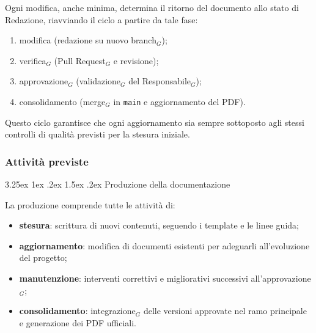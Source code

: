 \documentclass[a4paper, 10pt]{article}
\makeatletter
\renewcommand\paragraph{\@startsection{paragraph}{4}{\z@}%
  {3.25ex \@plus1ex \@minus .2ex}%
  {1.5ex \@plus .2ex}%
  {\normalfont\normalsize\bfseries}}
\makeatother
\begin{document}
Ogni modifica, anche minima, determina il ritorno del documento allo stato di Redazione, riavviando il ciclo a partire da tale fase:
\begin{enumerate}
    \item modifica (redazione su nuovo branch$_G$);
    \item verifica$_G$ (Pull Request$_G$ e revisione);
    \item approvazione$_G$ (validazione$_G$ del Responsabile$_G$);
    \item consolidamento (merge$_G$ in \texttt{main} e aggiornamento del PDF).
\end{enumerate}

Questo ciclo garantisce che ogni aggiornamento sia sempre sottoposto agli stessi controlli di qualità previsti per la stesura iniziale.

\subsubsection{Attività previste}
\label{subsec:attivita_documentazione}

\paragraph{Produzione della documentazione}

La produzione comprende tutte le attività di:
\begin{itemize}
    \item \textbf{stesura}: scrittura di nuovi contenuti, seguendo i template e le linee guida;
    \item \textbf{aggiornamento}: modifica di documenti esistenti per adeguarli all'evoluzione del progetto;
    \item \textbf{manutenzione}: interventi correttivi e migliorativi successivi all'approvazione$_G$;
    \item \textbf{consolidamento}: integrazione$_G$ delle versioni approvate nel ramo principale e generazione dei PDF ufficiali.
\end{itemize}
\end{document}

